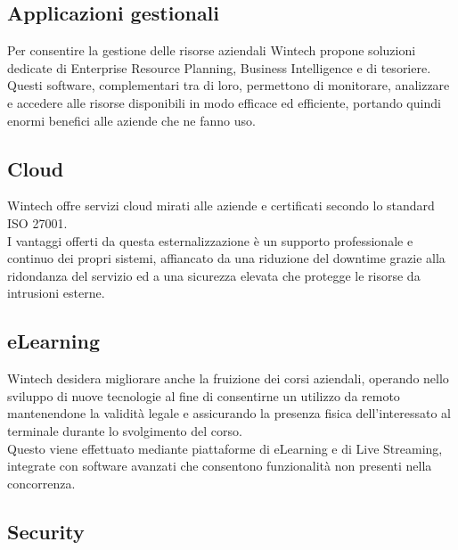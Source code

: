 \documentclass[Tesi.tex]{subfiles}
\begin{document}
\subsection{Applicazioni gestionali}
Per consentire la gestione delle risorse aziendali Wintech propone soluzioni dedicate di Enterprise Resource Planning, Business Intelligence e di tesoriere. \\
Questi software, complementari tra di loro, permettono di monitorare, analizzare e accedere alle risorse disponibili in modo efficace ed efficiente, portando quindi enormi benefici alle aziende che ne fanno uso.

\subsection{Cloud}
Wintech offre servizi cloud mirati alle aziende e certificati secondo lo standard ISO 27001. \\
I vantaggi offerti da questa esternalizzazione è un supporto professionale e continuo dei propri sistemi, affiancato da una riduzione del downtime grazie alla ridondanza del servizio ed a una sicurezza elevata che protegge le risorse da intrusioni esterne.

\subsection{eLearning}
Wintech desidera migliorare anche la fruizione dei corsi aziendali, operando nello sviluppo di nuove tecnologie al fine di consentirne un utilizzo da remoto mantenendone la validità legale e assicurando la presenza fisica dell'interessato al terminale durante lo svolgimento del corso. \\
Questo viene effettuato mediante piattaforme di eLearning e di Live Streaming, integrate con software avanzati che consentono funzionalità non presenti nella concorrenza.

\subsection{Security}
\end{document}
